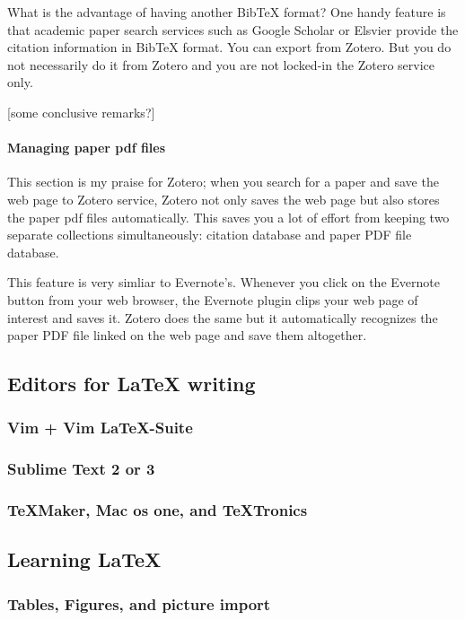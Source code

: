\documentclass[11pt]{article}
\begin{document}
What is the advantage of having another BibTeX format? One handy feature is
that academic paper search services such as Google Scholar or Elsvier provide
the citation information in BibTeX format. You can export from Zotero. But you
do not necessarily do it from Zotero and you are not locked-in the Zotero
service only. 

[some conclusive remarks?]

\paragraph{Managing paper pdf files}
This section is my praise for Zotero; when you search for a paper and
save the web page to Zotero service, Zotero not only saves the web page
but also stores the paper pdf files automatically. This saves you a lot
of effort from keeping two separate collections simultaneously: citation
database and paper PDF file database.

This feature is very simliar to Evernote's. Whenever you click on the Evernote
button from your web browser, the Evernote plugin clips your web page of
interest and saves it. Zotero does the same but it automatically recognizes
the paper PDF file linked on the web page and save them altogether.

\subsection{Editors for LaTeX writing}

\subsubsection{Vim + Vim LaTeX-Suite}

\subsubsection{Sublime Text 2 or 3}

\subsubsection{TeXMaker, Mac os one, and TeXTronics}


\subsection{Learning LaTeX}

\subsubsection{Tables, Figures, and picture import}
\end{document}
